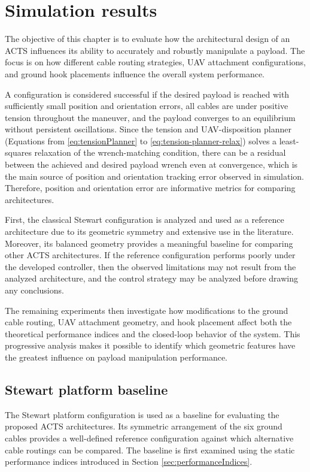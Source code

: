 \chapter{Simulation results}
\label{chap:results}

The objective of this chapter is to evaluate how the architectural design of an ACTS influences its ability to accurately and robustly manipulate a payload. The focus is on how different cable routing strategies, UAV attachment configurations, and ground hook placements influence the overall system performance.

A configuration is considered successful if the desired payload is reached with sufficiently small position and orientation errors, all cables are under positive tension throughout the maneuver, and the payload converges to an equilibrium without persistent oscillations. Since the tension and UAV-disposition planner (Equations from \eqref{eq:tensionPlanner} to \eqref{eq:tension-planner-relax}) solves a least-squares relaxation of the wrench-matching condition, there can be a residual between the achieved and desired payload wrench even at convergence, which is the main source of position and orientation tracking error observed in simulation. Therefore, position and orientation error are informative metrics for comparing architectures.

First, the classical Stewart configuration is analyzed and used as a reference architecture due to its geometric symmetry and extensive use in the literature. Moreover, its balanced geometry provides a meaningful baseline for comparing other ACTS architectures. If the reference configuration performs poorly under the developed controller, then the observed limitations may not result from the analyzed architecture, and the control strategy may be analyzed before drawing any conclusions.

The remaining experiments then investigate how modifications to the ground cable routing, UAV attachment geometry, and hook placement affect both the theoretical performance indices and the closed-loop behavior of the system. This progressive analysis makes it possible to identify which geometric features have the greatest influence on payload manipulation performance.

\section{Stewart platform baseline}
The Stewart platform configuration is used as a baseline for evaluating the proposed ACTS architectures. Its symmetric arrangement of the six ground cables provides a well-defined reference configuration against which alternative cable routings can be compared. The baseline is first examined using the static performance indices introduced in Section \ref{sec:performanceIndices}. 

